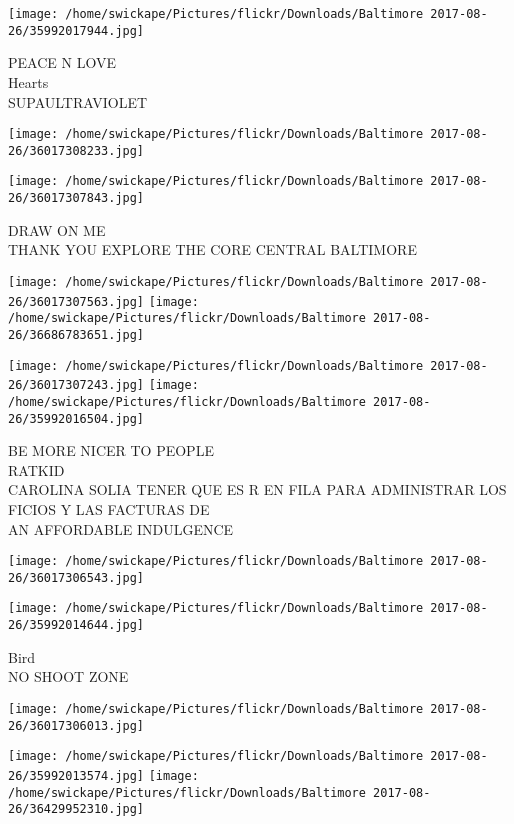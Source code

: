 \documentclass[10pt,letterpaper]{article}
\begin{document}
\texttt{[image: /home/swickape/Pictures/flickr/Downloads/Baltimore 2017-08-26/35992017944.jpg]}

PEACE N LOVE\\
Hearts\\
SUPAULTRAVIOLET
\pagebreak

\texttt{[image: /home/swickape/Pictures/flickr/Downloads/Baltimore 2017-08-26/36017308233.jpg]}

\vspace{0.25in}
\texttt{[image: /home/swickape/Pictures/flickr/Downloads/Baltimore 2017-08-26/36017307843.jpg]}

DRAW ON ME\\
THANK YOU EXPLORE THE CORE CENTRAL BALTIMORE
\pagebreak

\texttt{[image: /home/swickape/Pictures/flickr/Downloads/Baltimore 2017-08-26/36017307563.jpg]}
\texttt{[image: /home/swickape/Pictures/flickr/Downloads/Baltimore 2017-08-26/36686783651.jpg]}

\texttt{[image: /home/swickape/Pictures/flickr/Downloads/Baltimore 2017-08-26/36017307243.jpg]}
\texttt{[image: /home/swickape/Pictures/flickr/Downloads/Baltimore 2017-08-26/35992016504.jpg]}

BE MORE NICER TO PEOPLE\\
RATKID\\
CAROLINA SOLIA TENER QUE ES R EN FILA PARA ADMINISTRAR LOS FICIOS Y LAS FACTURAS DE\\
AN AFFORDABLE INDULGENCE
\pagebreak

\texttt{[image: /home/swickape/Pictures/flickr/Downloads/Baltimore 2017-08-26/36017306543.jpg]}

\vspace{0.25in}
\texttt{[image: /home/swickape/Pictures/flickr/Downloads/Baltimore 2017-08-26/35992014644.jpg]}

Bird\\
NO SHOOT ZONE
\pagebreak

\texttt{[image: /home/swickape/Pictures/flickr/Downloads/Baltimore 2017-08-26/36017306013.jpg]}

\vspace{0.25in}
\texttt{[image: /home/swickape/Pictures/flickr/Downloads/Baltimore 2017-08-26/35992013574.jpg]}
\texttt{[image: /home/swickape/Pictures/flickr/Downloads/Baltimore 2017-08-26/36429952310.jpg]}
\end{document}
